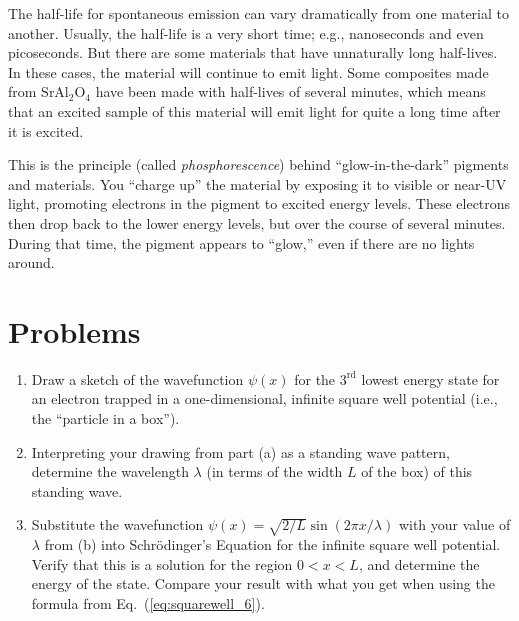 The half-life for spontaneous emission can vary dramatically from one
material to another. Usually, the half-life is a very short time; e.g.,
nanoseconds and even picoseconds. But there are some materials that have
unnaturally long half-lives.  In these cases, the material will continue
to emit light. Some composites made from SrAl$_2$O$_4$ have been made
with half-lives of several minutes, which means that an excited sample of
this material will emit light for quite a long time after it is excited.

This is the principle (called {\it phosphorescence}) behind ``glow-in-the-dark''
pigments and materials. You ``charge up'' the material by exposing
it to visible or near-UV light, promoting electrons in the pigment
to excited energy levels.  These electrons then drop back to the
lower energy levels, but over the course of several minutes. During that
time, the pigment appears to ``glow,'' even if there are no lights
around.
%
\newpage


\section*{Problems}
\label{sec:quantized_energies_problems}




\begin{problem}
\begin{enumerate}
\item Draw a sketch of the wavefunction $\psi(x)$ for the $3^\text{rd}$ 
lowest energy
state for an electron trapped in a one-dimensional, infinite square well 
potential (i.e., the ``particle in a box'').
\item Interpreting your drawing from part (a) as a standing wave pattern, determine the 
wavelength $\lambda$ (in terms of the width $L$ of the box)
of this standing wave. 
\item Substitute the wavefunction $\psi(x) = \sqrt{2/L}\sin(2\pi x/\lambda)$
with your value of $\lambda$ from (b)
into Schr\"{o}dinger's Equation for the infinite square well potential. Verify 
that this is a solution for the
region $0 < x < L$, and determine the energy of the state. Compare your
result with what you get when using the formula from 
Eq.~(\ref{eq:squarewell_6}).
\end{enumerate}
\label{prob:PinBox}
\end{problem}

